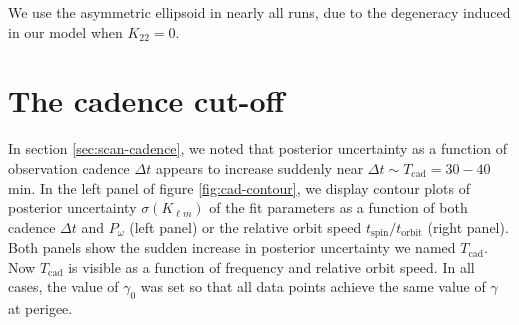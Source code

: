 We use the asymmetric ellipsoid in nearly all runs, due to the degeneracy induced in our model when $K_{22} = 0$.



\section{The cadence cut-off}
\label{app:cadence-tests}

In section \ref{sec:scan-cadence}, we noted that posterior uncertainty as a function of observation cadence $\Delta t$ appears to increase suddenly near $\Delta t \sim T_\text{cad}=30-40$ min. In the left panel of figure \ref{fig:cad-contour}, we display contour plots of posterior uncertainty $\sigma(K_{\ell m})$ of the fit parameters as a function of both cadence $\Delta t$ and $P_\omega$ (left panel) or the relative orbit speed $t_\text{spin} / t_\text{orbit}$ (right panel). Both panels show the sudden increase in posterior uncertainty we named $T_\text{cad}$. Now $T_\text{cad}$ is visible as a function of frequency and relative orbit speed. In all cases, the value of $\gamma_0$ was set so that all data points achieve the same value of $\gamma$ at perigee.

